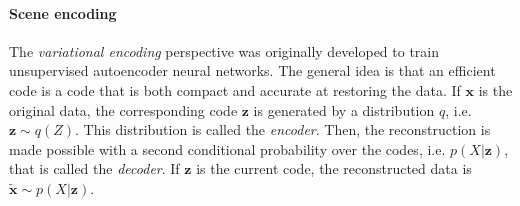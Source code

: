 \documentclass[12pt,twoside,openright]{article}
\begin{document}
\paragraph{Scene encoding}\label{sec:encoding}
The \emph{variational encoding} perspective \cite{hinton1994autoencoders} was originally developed 
to train unsupervised autoencoder neural networks. The general idea is that an efficient code 
is a code that is both compact and accurate at restoring the data. 
If $\boldsymbol{x}$ is the original data, the corresponding code $\boldsymbol{z}$ is generated by a distribution $q$, i.e. $\boldsymbol{z} \sim q(Z)$. This distribution is called the \emph{encoder}. Then, the reconstruction is made possible with a second conditional probability over the codes, i.e. $p(X|\boldsymbol{z})$, that is called the \emph{decoder}. If $\boldsymbol{z}$ is the current code, the reconstructed data is $\tilde{\boldsymbol{x}} \sim p(X|\boldsymbol{z})$. 
 
\end{document}

